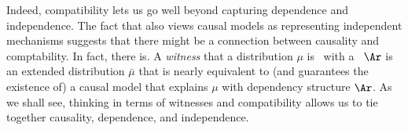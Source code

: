 %
Indeed, compatibility lets us go well beyond capturing dependence
and independence. The fact that \citet{pearl:2k} also views
causal models as representing independent mechanisms suggests that
there might be a connection between causality and
comptability. In fact, there is.
% 
A \emph{witness} that a distribution $\mu$ is \cible\ with a 
\hgraph\ $\Ar$ is an extended distribution $\bar\mu$ that 
is nearly equivalent to (and guarantees the existence of)
a causal model
%
that explains $\mu$ with dependency structure $\Ar$. 
As we shall see, thinking in terms of witnesses and compatibility
allows us to tie together causality, dependence, and independence.


